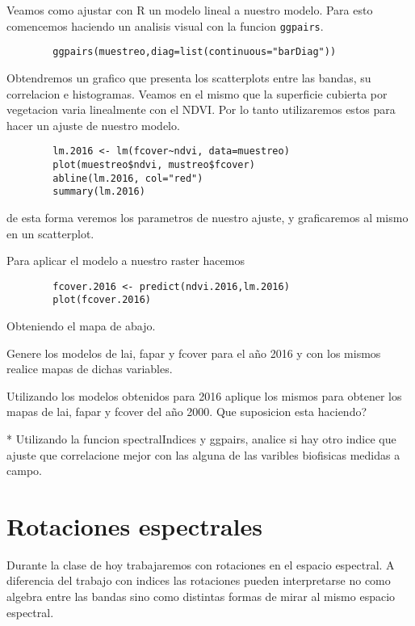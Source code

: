 \documentclass[a4paper]{article}
\begin{document}
\begin{exa}
    Veamos como ajustar con R un modelo lineal a nuestro modelo. Para esto
    comencemos haciendo un analisis visual con la funcion \texttt{ggpairs}.
    \begin{lstlisting}
        ggpairs(muestreo,diag=list(continuous="barDiag"))
    \end{lstlisting}
    Obtendremos un grafico que presenta los scatterplots entre las bandas, su
    correlacion e histogramas.
    Veamos en el mismo que la superficie cubierta por vegetacion varia
    linealmente con el NDVI\@. Por lo tanto utilizaremos estos para hacer un
    ajuste de nuestro modelo.
    \begin{lstlisting}
        lm.2016 <- lm(fcover~ndvi, data=muestreo)
        plot(muestreo$ndvi, mustreo$fcover)
        abline(lm.2016, col="red")
        summary(lm.2016)
    \end{lstlisting}
    de esta forma veremos los parametros de nuestro ajuste, y graficaremos al
    mismo en un scatterplot.

    Para aplicar el modelo a nuestro raster hacemos
    \begin{lstlisting}
        fcover.2016 <- predict(ndvi.2016,lm.2016)
        plot(fcover.2016)
    \end{lstlisting}
    Obteniendo el mapa de abajo.
\end{exa}

\begin{act}
    Genere los modelos de lai, fapar y fcover para el año 2016 y con los mismos
    realice mapas de dichas variables.
\end{act}

\begin{act}
    Utilizando los modelos obtenidos para 2016 aplique los mismos para obtener
    los mapas de lai, fapar y fcover del año 2000. Que suposicion esta
    haciendo?
\end{act}

\begin{act}
    * Utilizando la funcion spectralIndices y ggpairs, analice si hay otro indice
    que ajuste que correlacione mejor con las alguna de las varibles biofisicas
    medidas a campo.
\end{act}

\section{Rotaciones espectrales}
\label{sec:rota}
Durante la clase de hoy trabajaremos con rotaciones en el espacio espectral. A
diferencia del trabajo con indices las rotaciones pueden interpretarse no como
algebra entre las bandas sino como distintas formas de mirar al mismo espacio
espectral.
\end{document}
